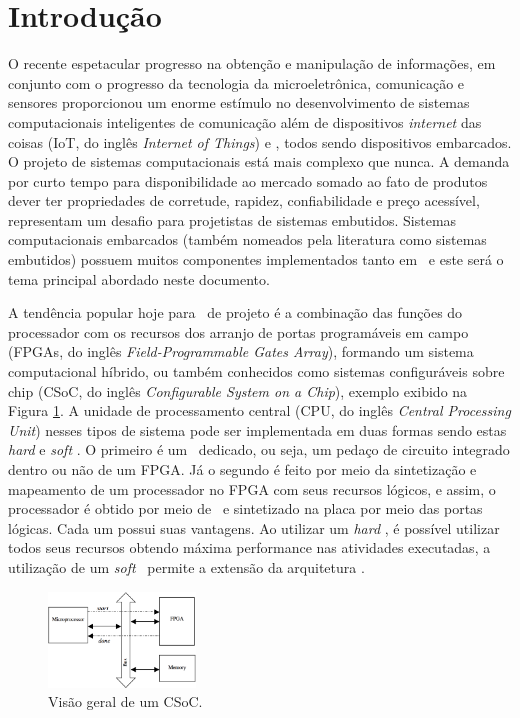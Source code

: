\section{Introdução} \label{chap:introducao}
	O recente espetacular progresso na obtenção e manipulação de informações, em conjunto com o progresso da tecnologia da microeletrônica, comunicação e sensores proporcionou um enorme estímulo no desenvolvimento de sistemas computacionais inteligentes de comunicação além de dispositivos \textit{internet} das coisas (IoT, do inglês \textit{Internet of Things}) e \wearables, todos sendo dispositivos embarcados. %
	O projeto de sistemas computacionais está mais complexo que nunca. A demanda por curto tempo para disponibilidade ao mercado somado ao fato de produtos dever ter propriedades de corretude, rapidez, confiabilidade e preço acessível, representam um desafio para projetistas de sistemas embutidos.
	Sistemas computacionais embarcados (também nomeados pela literatura como sistemas embutidos) possuem muitos componentes implementados tanto em \hs\ e este será o tema principal abordado neste documento.

	A tendência popular hoje para \design\ de projeto é a combinação das funções do processador com os recursos dos arranjo de portas programáveis em campo (FPGAs, do inglês \textit{Field-Programmable Gates Array}), formando um sistema computacional híbrido, ou também conhecidos como sistemas configuráveis sobre chip (CSoC, do inglês \textit{Configurable System on a Chip}), exemplo exibido na Figura \ref{fig:i-soc}. %
	A unidade de processamento central (CPU, do inglês \textit{Central Processing Unit}) nesses tipos de sistema pode ser implementada em duas formas sendo estas \textit{hard} e \textit{soft} \cores.
	O primeiro é um \core\ dedicado, ou seja, um pedaço de circuito integrado dentro ou não de um FPGA.
	Já o segundo é feito por meio da sintetização e mapeamento de um processador no FPGA com seus recursos lógicos, e assim, o processador é obtido por meio de \design\ e sintetizado na placa por meio das portas lógicas.
	Cada um possui suas vantagens. Ao utilizar um \textit{hard} \core, é possível utilizar todos seus recursos obtendo máxima performance nas atividades executadas, a utilização de um \textit{soft} \core\ permite a extensão da arquitetura \cite{Plessl2003}.

	\begin{figure}[!b] \centering
		\includegraphics[width=0.35\textwidth]{img/into-soc.png}
		\caption{Visão geral de um CSoC.}
		\label{fig:i-soc}
	\end{figure}

